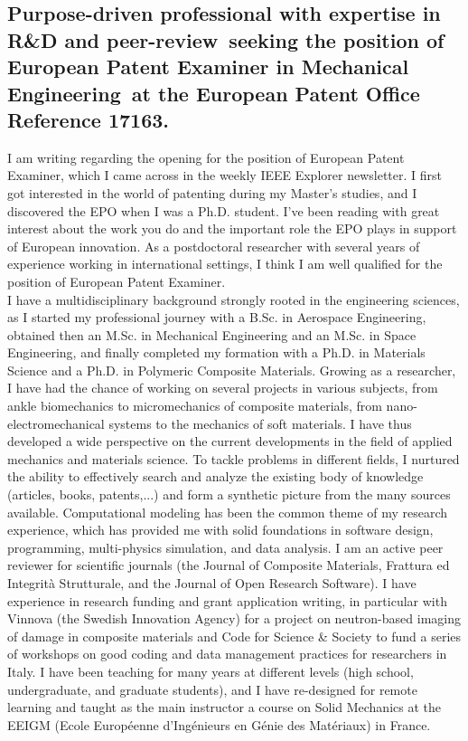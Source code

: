 \documentclass[
  a4paper, 
]{fortysecondscv}
\def\expertise{R\&D and peer-review}
\def\position{the position of European Patent Examiner in Mechanical Engineering}
\def\company{the European Patent Office}
\def\reference{\\[6pt] Reference 17163}
\def\salutation{MADAM/SIR}
\begin{document}
\makefrontsidebar

\cvsignature
\vspace*{12pt}
\subsection{\textbf{Purpose-driven professional with expertise in \expertise\ seeking \position\ at \company\reference.}}
\vspace*{12pt}
I am writing regarding the opening for the position of European Patent Examiner, which I came across in the weekly IEEE Explorer newsletter. I first got interested in the world of patenting during my Master's studies, and I discovered the EPO when I was a Ph.D. student. I've been reading with great interest about the work you do and the important role the EPO plays in support of European innovation. As a postdoctoral researcher with several years of experience working in international settings, I think I am well qualified for the position of European Patent Examiner.\\[6pt]
I have a multidisciplinary background strongly rooted in the engineering sciences, as I started my professional journey with a B.Sc. in Aerospace Engineering, obtained then an M.Sc. in Mechanical Engineering and an M.Sc. in Space Engineering, and finally completed my formation with a Ph.D. in Materials Science and a Ph.D. in Polymeric Composite Materials. Growing as a researcher, I have had the chance of working on several projects in various subjects, from ankle biomechanics to micromechanics of composite materials, from nano-electromechanical systems to the mechanics of soft materials. I have thus developed a wide perspective on the current developments in the field of applied mechanics and materials science. To tackle problems in different fields, I nurtured the ability to effectively search and analyze the existing body of knowledge (articles, books, patents,...) and form a synthetic picture from the many sources available. Computational modeling has been the common theme of my research experience, which has provided me with solid foundations in software design, programming, multi-physics simulation, and data analysis. I am an active peer reviewer for scientific journals (the Journal of Composite Materials, Frattura ed Integrit{\`a} Strutturale, and the Journal of Open Research Software). I have experience in research funding and grant application writing, in particular with Vinnova (the Swedish Innovation Agency) for a project on neutron-based imaging of damage in composite materials and Code for Science \& Society to fund a series of workshops on good coding and data management practices for researchers in Italy. I have been teaching for many years at different levels (high school, undergraduate, and graduate students), and I have re-designed for remote learning and taught as the main instructor a course on Solid Mechanics at the EEIGM (Ecole Europ{\'e}enne d’Ing{\'e}nieurs en G{\'e}nie des Mat{\'e}riaux) in France.\\[6pt]
\end{document}

